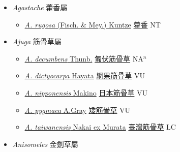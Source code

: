 
  \begin{itemize}
 \item[] \textit{Agastache} 藿香屬
                    
  \begin{itemize}
        \item[] \href{http://www.theplantlist.org/tpl1.1/search?q=Agastache+rugosa}{\textit{A. rugosa} (Fisch. \& Mey.) Kuntze}   \href{\detokenize{http://taibnet.sinica.edu.tw/chi/taibnet_species_list.php?T2=藿香&T2_new_value=true&fr=y}}{藿香} NT
  \end{itemize}
 \item[] \textit{Ajuga} 筋骨草屬
                    
  \begin{itemize}
        \item[] \href{http://www.theplantlist.org/tpl1.1/search?q=Ajuga+decumbens}{\textit{A. decumbens} Thunb.}   \href{\detokenize{http://taibnet.sinica.edu.tw/chi/taibnet_species_list.php?T2=匍伏筋骨草&T2_new_value=true&fr=y}}{匍伏筋骨草} NA$^n$
        \item[] \href{http://www.theplantlist.org/tpl1.1/search?q=Ajuga+dictyocarpa}{\textit{A. dictyocarpa} Hayata}   \href{\detokenize{http://taibnet.sinica.edu.tw/chi/taibnet_species_list.php?T2=網果筋骨草&T2_new_value=true&fr=y}}{網果筋骨草} VU
        \item[] \href{http://www.theplantlist.org/tpl1.1/search?q=Ajuga+nipponensis}{\textit{A. nipponensis} Makino}   \href{\detokenize{http://taibnet.sinica.edu.tw/chi/taibnet_species_list.php?T2=日本筋骨草&T2_new_value=true&fr=y}}{日本筋骨草} VU
        \item[] \href{http://www.theplantlist.org/tpl1.1/search?q=Ajuga+pygmaea}{\textit{A. pygmaea} A.Gray}   \href{\detokenize{http://taibnet.sinica.edu.tw/chi/taibnet_species_list.php?T2=矮筋骨草&T2_new_value=true&fr=y}}{矮筋骨草} VU
        \item[] \href{http://www.theplantlist.org/tpl1.1/search?q=Ajuga+taiwanensis}{\textit{A. taiwanensis} Nakai ex Murata}   \href{\detokenize{http://taibnet.sinica.edu.tw/chi/taibnet_species_list.php?T2=臺灣筋骨草&T2_new_value=true&fr=y}}{臺灣筋骨草} LC
  \end{itemize}
 \item[] \textit{Anisomeles} 金劍草屬
                    

\end{itemize}
